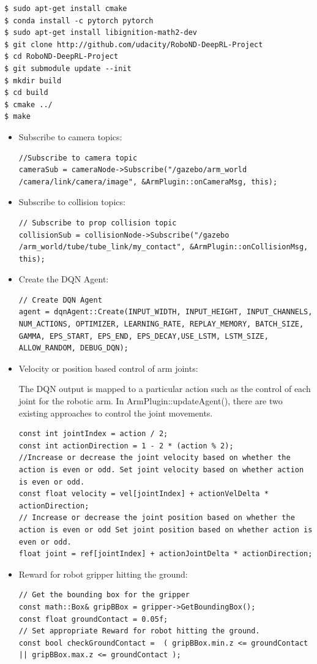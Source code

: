 \documentclass[10pt,journal,compsoc]{IEEEtran}
\begin{document}
\begin{lstlisting}
$ sudo apt-get install cmake
$ conda install -c pytorch pytorch
$ sudo apt-get install libignition-math2-dev
$ git clone http://github.com/udacity/RoboND-DeepRL-Project
$ cd RoboND-DeepRL-Project
$ git submodule update --init
$ mkdir build
$ cd build
$ cmake ../
$ make
\end{lstlisting}
\begin{itemize}
\item  Subscribe to camera topics:
\begin{lstlisting}
//Subscribe to camera topic
cameraSub = cameraNode->Subscribe("/gazebo/arm_world
/camera/link/camera/image", &ArmPlugin::onCameraMsg, this);
\end{lstlisting}
\item Subscribe to collision topics:
\begin{lstlisting}
// Subscribe to prop collision topic
collisionSub = collisionNode->Subscribe("/gazebo
/arm_world/tube/tube_link/my_contact", &ArmPlugin::onCollisionMsg, this);
\end{lstlisting}
\item Create the DQN Agent:
\begin{lstlisting}
// Create DQN Agent
agent = dqnAgent::Create(INPUT_WIDTH, INPUT_HEIGHT, INPUT_CHANNELS, NUM_ACTIONS, OPTIMIZER, LEARNING_RATE, REPLAY_MEMORY, BATCH_SIZE, GAMMA, EPS_START, EPS_END, EPS_DECAY,USE_LSTM, LSTM_SIZE, ALLOW_RANDOM, DEBUG_DQN);
\end{lstlisting}
\item Velocity or position based control of arm joints:

The DQN output is mapped to a particular action such as the control of each joint for the robotic arm. In ArmPlugin::updateAgent(), there are two existing approaches to control the joint movements.
\begin{lstlisting}
const int jointIndex = action / 2;
const int actionDirection = 1 - 2 * (action % 2);
//Increase or decrease the joint velocity based on whether the action is even or odd. Set joint velocity based on whether action is even or odd.
const float velocity = vel[jointIndex] + actionVelDelta * actionDirection; 
// Increase or decrease the joint position based on whether the action is even or odd Set joint position based on whether action is even or odd.
float joint = ref[jointIndex] + actionJointDelta * actionDirection;
\end{lstlisting}

\item Reward for robot gripper hitting the ground:
\begin{lstlisting}
// Get the bounding box for the gripper		
const math::Box& gripBBox = gripper->GetBoundingBox();
const float groundContact = 0.05f;
// Set appropriate Reward for robot hitting the ground.
const bool checkGroundContact =  ( gripBBox.min.z <= groundContact || gripBBox.max.z <= groundContact );
\end{lstlisting}
\end {itemize}
\end{document}
